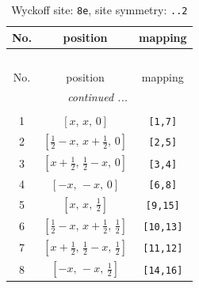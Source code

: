 \documentclass[fleqn,8pt]{jsarticle}
\begin{document}
\renewcommand{\arraystretch}{1.2}
\begin{longtable}{ccc}
\caption{Wyckoff site: {\tt 8e}, site symmetry: {\tt ..2}}
 \\
 \hline \hline
No. & position & mapping \\ \hline \endfirsthead

\multicolumn{2}{l}{\tablename\ \thetable{}} \\
 \hline \hline
No. & position & mapping \\ \hline \endhead

 \hline \hline
\multicolumn{2}{r}{\footnotesize\it continued ...} \\ \endfoot

 \hline \hline
\multicolumn{2}{r}{} \\ \endlastfoot

1 & $\left[ x,\, x,\, 0 \right]$ & {\tt [1,7]} \\ \hline
2 & $\left[ \frac{1}{2} - x,\, x + \frac{1}{2},\, 0 \right]$ & {\tt [2,5]} \\ \hline
3 & $\left[ x + \frac{1}{2},\, \frac{1}{2} - x,\, 0 \right]$ & {\tt [3,4]} \\ \hline
4 & $\left[ - x,\, - x,\, 0 \right]$ & {\tt [6,8]} \\ \hline
5 & $\left[ x,\, x,\, \frac{1}{2} \right]$ & {\tt [9,15]} \\ \hline
6 & $\left[ \frac{1}{2} - x,\, x + \frac{1}{2},\, \frac{1}{2} \right]$ & {\tt [10,13]} \\ \hline
7 & $\left[ x + \frac{1}{2},\, \frac{1}{2} - x,\, \frac{1}{2} \right]$ & {\tt [11,12]} \\ \hline
8 & $\left[ - x,\, - x,\, \frac{1}{2} \right]$ & {\tt [14,16]} \\
\end{longtable}
\renewcommand{\arraystretch}{1.2}
\end{document}

